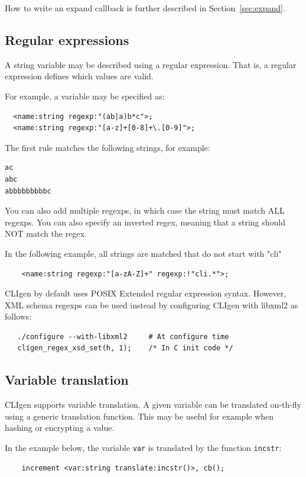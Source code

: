 \documentclass[a4paper, 10pt] {article}
\begin{document}
How to write an expand callback is further described in
Section~\ref{sec:expand}.

\subsection{Regular expressions}

A string variable may be described using a regular expression. That
is, a regular expression defines which values are valid. 

For example, a variable may be specified as:
\begin{verbatim}
  <name:string regexp:"(ab|a)b*c">;
  <name:string regexp:"[a-z]+[0-8]+\.[0-9]">;
\end{verbatim}
The first rule matches the following strings, for example:
\begin{verbatim}
ac
abc
abbbbbbbbbc
\end{verbatim}

You can also add multiple regexps, in which case the string must match ALL regexps. You can also specify an inverted regex, meaning that a string should NOT match the regex.

In the following example, all strings are matched that do not start with "cli"
\begin{verbatim}
    <name:string regexp:"[a-zA-Z]+" regexp:!"cli.*">;
\end{verbatim}

CLIgen by default uses POSIX Extended regular expression syntax.
However, XML schema regexps can be used instead by configuring CLIgen with libxml2 as follows:
\begin{verbatim}
   ./configure --with-libxml2     # At configure time
   cligen_regex_xsd_set(h, 1);    /* In C init code */
\end{verbatim}

\subsection{Variable translation}

CLIgen supports variable translation. A given variable can be
translated on-th-fly using a generic translation function. This may be useful for example when hashing or encrypting a value.

In the example below, the variable {\tt var} is translated by the function {\tt incstr}:
\begin{verbatim}
    increment <var:string translate:incstr()>, cb();
\end{verbatim}
\end{document}
